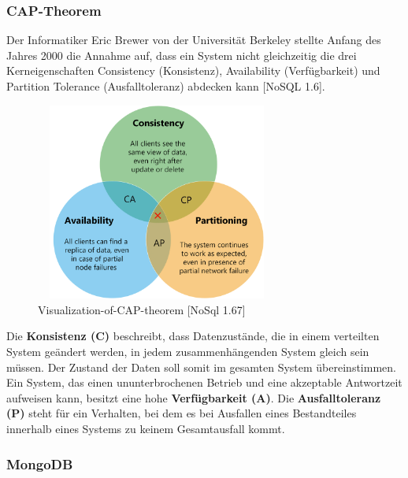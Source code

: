 \subsubsection{CAP-Theorem}
Der Informatiker Eric Brewer von der Universität Berkeley stellte Anfang des Jahres 2000 die Annahme auf, dass ein System nicht gleichzeitig die drei Kerneigenschaften Consistency (Konsistenz), Availability (Verfügbarkeit) und Partition Tolerance (Ausfalltoleranz) abdecken kann [NoSQL 1.6]. 
\newline

\begin{figure}[h]
\centering
\includegraphics[width=8cm, height=6.5cm]{images/Visualization-of-CAP-theorem.png}
\caption{Visualization-of-CAP-theorem [NoSql 1.67]}
\end{figure}

Die \textbf{Konsistenz (C)} beschreibt, dass Datenzustände, die in einem verteilten System geändert  werden, in jedem zusammenhängenden System gleich sein müssen. Der Zustand der Daten soll somit im gesamten System übereinstimmen. Ein System, das einen ununterbrochenen Betrieb und eine akzeptable Antwortzeit aufweisen kann, besitzt eine hohe \textbf{Verfügbarkeit (A)}. Die \textbf{Ausfalltoleranz (P)} steht für ein Verhalten, bei dem es bei Ausfallen eines Bestandteiles innerhalb eines Systems  zu keinem Gesamtausfall kommt.

\newpage
\subsubsection{MongoDB}

\newpage